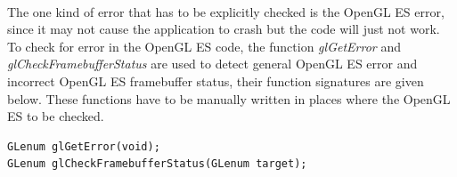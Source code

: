 \documentclass[12pt,twoside]{article}
\begin{document}
\\
The one kind of error that has to be explicitly checked is the OpenGL ES error, since it may not cause the application to crash but the code will just not work. To check for error in the OpenGL ES code, the function \textit{glGetError} and \textit{glCheckFramebufferStatus} are used to detect general OpenGL ES error and incorrect OpenGL ES framebuffer status, their function signatures are given below. These functions have to be manually written in places where the OpenGL ES to be checked.\\
\begin{lstlisting}
GLenum glGetError(void);
GLenum glCheckFramebufferStatus(GLenum target);
\end{lstlisting}



\newpage
\end{document}
